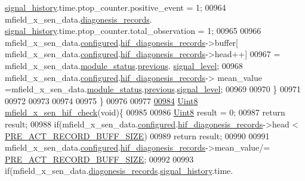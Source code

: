 \begin{DoxyCode}
{{      \hyperlink{a00019_ab7038f4de1f77b52a7f89e9f77c0b846}{signal\_history}.time.ptop\_counter.positive\_event     = 1;
00964                    mfield\_x\_sen\_data.\hyperlink{a00025_a2bd79ce84bbd6b7f50d38954f7ae475e}{diagonesis\_records}.
      \hyperlink{a00019_ab7038f4de1f77b52a7f89e9f77c0b846}{signal\_history}.time.ptop\_counter.total\_observation  = 1;
00965 
00966                mfield\_x\_sen\_data.\hyperlink{a00025_a94b2d1f6ea4ab334c74d24984dd27843}{configured}.\hyperlink{a00021_ae18294f7499d9fcb5ec796a1816b8cd8}{hif\_diagonesis\_records}->buffer[
      mfield\_x\_sen\_data.\hyperlink{a00025_a94b2d1f6ea4ab334c74d24984dd27843}{configured}.\hyperlink{a00021_ae18294f7499d9fcb5ec796a1816b8cd8}{hif\_diagonesis\_records}->head++]
00967                = mfield\_x\_sen\_data.\hyperlink{a00025_adfab5a5d8b45a93dfb13edb24e2b80e3}{module\_status}.\hyperlink{a00019_adcb859b2f3983a9c58deab28e59c333f}{previous}.
      \hyperlink{a00019_a4070db8eab0ff93e3fbc1df59872f117}{signal\_level};
00968                mfield\_x\_sen\_data.\hyperlink{a00025_a94b2d1f6ea4ab334c74d24984dd27843}{configured}.\hyperlink{a00021_ae18294f7499d9fcb5ec796a1816b8cd8}{hif\_diagonesis\_records}->
      mean\_value =mfield\_x\_sen\_data.\hyperlink{a00025_adfab5a5d8b45a93dfb13edb24e2b80e3}{module\_status}.\hyperlink{a00019_adcb859b2f3983a9c58deab28e59c333f}{previous}.\hyperlink{a00019_a4070db8eab0ff93e3fbc1df59872f117}{signal\_level};
00969 
00970          \}
00971 
00972 
00973 
00974 
00975  \}
00976 
00977 
\hypertarget{a00052_source_l00984}{}\hyperlink{a00052_ad309ab77ec43baa60232db1809199756}{00984} \hyperlink{a00072_af84840501dec18061d18a68c162a8fa2}{Uint8} \hyperlink{a00052_ad309ab77ec43baa60232db1809199756}{mfield\_x\_sen\_hif\_check}(\textcolor{keywordtype}{void})\{
00985 
00986     \hyperlink{a00072_af84840501dec18061d18a68c162a8fa2}{Uint8} result = 0;
00987 \textcolor{keywordflow}{return} result;
00988     \textcolor{keywordflow}{if}(mfield\_x\_sen\_data.\hyperlink{a00025_a94b2d1f6ea4ab334c74d24984dd27843}{configured}.\hyperlink{a00021_ae18294f7499d9fcb5ec796a1816b8cd8}{hif\_diagonesis\_records}->head < 
      \hyperlink{a00022_a18dcecc16ded13fa622e0913e73442e6}{PRE\_ACT\_RECORD\_BUFF\_SIZE})
00989         \textcolor{keywordflow}{return} result;
00990 
00991     mfield\_x\_sen\_data.\hyperlink{a00025_a94b2d1f6ea4ab334c74d24984dd27843}{configured}.\hyperlink{a00021_ae18294f7499d9fcb5ec796a1816b8cd8}{hif\_diagonesis\_records}->mean\_value/=
      \hyperlink{a00022_a18dcecc16ded13fa622e0913e73442e6}{PRE\_ACT\_RECORD\_BUFF\_SIZE};
00992 
00993     \textcolor{keywordflow}{if}(mfield\_x\_sen\_data.\hyperlink{a00025_a2bd79ce84bbd6b7f50d38954f7ae475e}{diagonesis\_records}.\hyperlink{a00019_ab7038f4de1f77b52a7f89e9f77c0b846}{signal\_history}.time.
}}
\end{DoxyCode}
